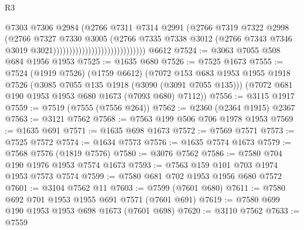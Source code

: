 \begin{lexlean}{R3}
\begin{coremodule}
                                                    @7303
                                                    @7306
                                                    @2984
                                                    (@2766
                                                      @7311
                                                      @7314
                                                      @2991
                                                      (@2766
                                                        @7319
                                                        @7322
                                                        @2998
                                                        (@2766
                                                          @7327
                                                          @7330
                                                          @3005
                                                          (@2766
                                                            @7335
                                                            @7338
                                                            @3012
                                                            (@2766
                                                              @7343
                                                              @7346
                                                              @3019
                                                              @3021)))))))))))))))))))))))))))))
    @6612
@7524 := @3063 @7055 @508 @684 @1956 @1953
@7525 := @1635 @680
@7526 := @7525 @1673
@7555 := @7524
    (@1919 @7526)
    (@1759 @6612)
    (@7072
      @153
      @683
      @1953
      @1955
      @1918
      @7526
      (@3085 @7055 @135 @1918 (@3090 (@3091 @7055 @135)))
      (@7072 @681 @190 @1953 @1953 @680 @1673 (@7093 @680) @7112))
@7556 := @3115 @1917
@7559 := @7519 (@7555 (@7556 @264))
@7562 := @2360 (@2364 @1915) @2367
@7563 := @3121 @7562
@7568 := @7563 @199 @506 @706 @1978 @1953
@7569 := @1635 @691
@7571 := @1635 @698 @1673
@7572 := @7569 @7571
@7573 := @7525 @7572
@7574 := @1634 @7573
@7576 := @1635 @7574 @1673
@7579 := @7568 @7576 (@1819 @7576)
@7580 := @3076 @7562
@7586 := @7580 @704 @190 @1976 @1953 @7574 @1673
@7593 := @7563 @159 @101 @703 @1974 @1953 @7573 @7574
@7599 := @7580 @681 @702 @1953 @1956 @680 @7572
@7601 := @3104 @7562 @11
@7603 := @7599 (@7601 @680)
@7611 := @7580 @692 @701 @1953 @1955 @691 @7571 (@7601 @691)
@7619 := @7580 @699 @190 @1953 @1953 @698 @1673 (@7601 @698)
@7620 := @3110 @7562
@7633 := @7559

\end{coremodule}
\end{lexlean}
